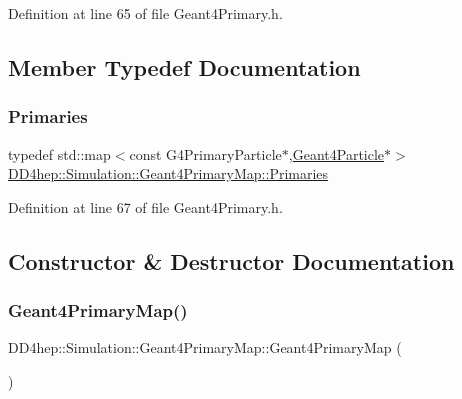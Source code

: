 Definition at line 65 of file Geant4\+Primary.\+h.



\subsection{Member Typedef Documentation}
\hypertarget{class_d_d4hep_1_1_simulation_1_1_geant4_primary_map_aec80e9bb254e582ef410dc65da5809c3}{}\label{class_d_d4hep_1_1_simulation_1_1_geant4_primary_map_aec80e9bb254e582ef410dc65da5809c3} 
\subsubsection{\texorpdfstring{Primaries}{Primaries}}
{\footnotesize\ttfamily typedef std\+::map$<$const G4\+Primary\+Particle$\ast$,\hyperlink{class_d_d4hep_1_1_simulation_1_1_geant4_particle}{Geant4\+Particle}$\ast$$>$ \hyperlink{class_d_d4hep_1_1_simulation_1_1_geant4_primary_map_aec80e9bb254e582ef410dc65da5809c3}{D\+D4hep\+::\+Simulation\+::\+Geant4\+Primary\+Map\+::\+Primaries}}



Definition at line 67 of file Geant4\+Primary.\+h.



\subsection{Constructor \& Destructor Documentation}
\hypertarget{class_d_d4hep_1_1_simulation_1_1_geant4_primary_map_af51091630c9dbeb00db33d3871af05e4}{}\label{class_d_d4hep_1_1_simulation_1_1_geant4_primary_map_af51091630c9dbeb00db33d3871af05e4} 
\subsubsection{\texorpdfstring{Geant4\+Primary\+Map()}{Geant4PrimaryMap()}}
{\footnotesize\ttfamily D\+D4hep\+::\+Simulation\+::\+Geant4\+Primary\+Map\+::\+Geant4\+Primary\+Map (\begin{DoxyParamCaption}{ }\end{DoxyParamCaption})\hspace{0.3cm}{\ttfamily [inline]}}



